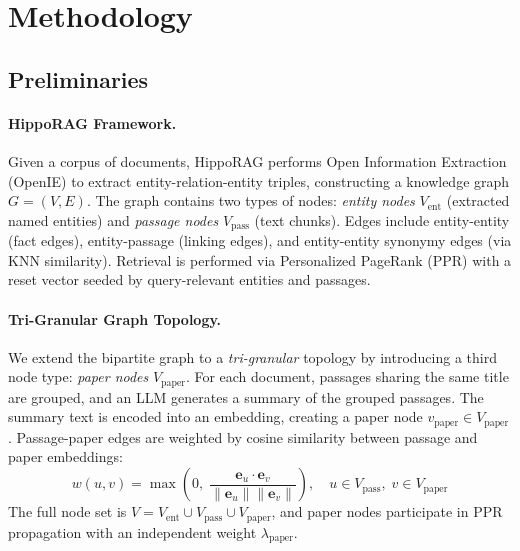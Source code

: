 \documentclass[conference,a4paper]{IEEEtran}
\newcommand{\bm}[1]{\boldsymbol{#1}}
\begin{document}
\section{Methodology}\label{sec:method}

\subsection{Preliminaries}\label{sec:preliminaries}

\paragraph{HippoRAG Framework.}
Given a corpus of documents, HippoRAG performs Open Information Extraction (OpenIE) to extract entity-relation-entity triples, constructing a knowledge graph $G = (V, E)$. The graph contains two types of nodes: \textit{entity nodes} $V_{\text{ent}}$ (extracted named entities) and \textit{passage nodes} $V_{\text{pass}}$ (text chunks). Edges include entity-entity (fact edges), entity-passage (linking edges), and entity-entity synonymy edges (via KNN similarity). Retrieval is performed via Personalized PageRank (PPR) with a reset vector seeded by query-relevant entities and passages.

\paragraph{Tri-Granular Graph Topology.}
We extend the bipartite graph to a \textit{tri-granular} topology by introducing a third node type: \textit{paper nodes} $V_{\text{paper}}$. For each document, passages sharing the same title are grouped, and an LLM generates a summary of the grouped passages. The summary text is encoded into an embedding, creating a paper node $v_{\text{paper}} \in V_{\text{paper}}$. Passage-paper edges are weighted by cosine similarity between passage and paper embeddings:
\begin{equation}
    w(u, v) = \max\!\left(0,\; \frac{\bm{e}_u \cdot \bm{e}_v}{\|\bm{e}_u\| \|\bm{e}_v\|}\right), \quad u \in V_{\text{pass}},\; v \in V_{\text{paper}}
\end{equation}
The full node set is $V = V_{\text{ent}} \cup V_{\text{pass}} \cup V_{\text{paper}}$, and paper nodes participate in PPR propagation with an independent weight $\lambda_{\text{paper}}$.
\end{document}
